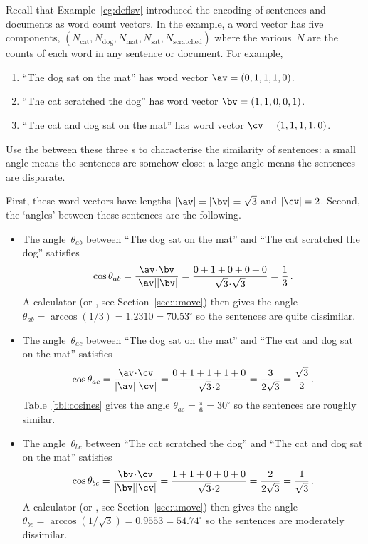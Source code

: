 \begin{example} \label{eg:lsidot}
Recall that Example~\ref{eg:deflsv} introduced the encoding of sentences and documents as word count vectors.
In the example, a word vector has five components, \((N_{\text{cat}},N_{\text{dog}},N_{\text{mat}},N_{\text{sat}},N_{\text{scratched}})\) where the various~\(N\) are the counts of each word in any sentence or document. For example,
\begin{enumerate}
\item ``The dog sat on the mat'' has word vector \(\av=(0,1,1,1,0)\).
\item ``The cat scratched the dog'' has word vector \(\bv=(1,1,0,0,1)\).
\item ``The cat and dog sat on the mat'' has word vector \(\cv=(1,1,1,1,0)\).
\end{enumerate}
Use the  between these three s to characterise the similarity of sentences: a small angle means the sentences are somehow close; a large angle means the sentences are disparate.
\begin{solution} 
First, these word vectors have lengths \(|\av|=|\bv|=\sqrt3\) and \(|\cv|=2\).
Second, the `angles' between these sentences are the following.
\begin{itemize}
\item The angle~\(\theta_{ab}\) between ``The dog sat on the mat'' and ``The cat scratched the dog'' satisfies
\begin{equation*}
\cos\theta_{ab}=\frac{\av\cdot\bv}{|\av||\bv|}
=\frac{0+1+0+0+0}{\sqrt3\cdot\sqrt3}=\frac13\,.
\end{equation*}
A calculator  (or \script, see Section~\ref{sec:umovc}) then gives the angle \(\theta_{ab} =\arccos(1/3) =1.2310=70.53^\circ\) so the sentences are quite dissimilar.

\item The angle~\(\theta_{ac}\) between ``The dog sat on the mat'' and ``The cat and dog sat on the mat'' satisfies
\begin{equation*}
\cos\theta_{ac}=\frac{\av\cdot\cv}{|\av||\cv|}
=\frac{0+1+1+1+0}{\sqrt3\cdot2}=\frac3{2\sqrt3}=\frac{\sqrt3}2\,.
\end{equation*}
Table~\ref{tbl:cosines} gives the angle \(\theta_{ac}=\tfrac\pi6=30^\circ\) so the sentences are roughly similar.

\item The angle~\(\theta_{bc}\) between ``The cat scratched the dog'' and ``The cat and dog sat on the mat'' satisfies
\begin{equation*}
\cos\theta_{bc}=\frac{\bv\cdot\cv}{|\bv||\cv|}
=\frac{1+1+0+0+0}{\sqrt3\cdot2}=\frac2{2\sqrt3}=\frac1{\sqrt3}\,.
\end{equation*}
A calculator  (or \script, see Section~\ref{sec:umovc}) then gives the angle \(\theta_{bc} =\arccos(1/\sqrt3) =0.9553 =54.74^\circ\) so the sentences are moderately dissimilar.


\end{itemize}
\end{solution}
\end{example}
